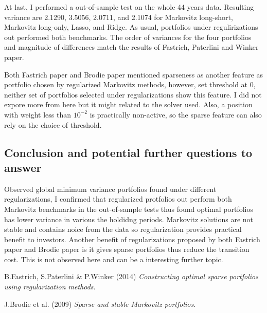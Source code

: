\documentclass{article}
\begin{document}
At last, I performed a out-of-sample test on the whole 44 years data. Resulting
variance are 2.1290, 3.5056, 2.0711, and 2.1074 for Markovitz long-short,
Markovitz long-only, Lasso, and Ridge. As usual, portfolios under regulirizations
out performed both benchmarks. The order of variances for the four portfolios
and magnitude of differences
match the results of Fastrich, Paterlini and Winker paper.

Both Fastrich paper and Brodie paper mentioned sparseness as another feature as
portfolio chosen by regularized Markovitz methods, however, set threshold at 0,
neither set of portfolios selected under regularizations show this feature. I
did not expore more from here but it might related to the solver used. Also,
a position with weight less than $10^{-2}$ is practically non-active, so the
sparse feature can also rely on the choice of threshold.

\subsection*{Conclusion and potential further questions to answer}

Observed global minimum variance portfolios found under different regularizations,
I confirmed that regularized protfolios out perform both Markovitz benchmarks
in the out-of-sample tests thus found optimal portfolios has lower variance in various
the holdidng periods. Markovitz solutions are not stable and contains noice from the
data so regularization provides practical benefit to investors. Another benefit
of regularizations proposed by both Fastrich paper and Brodie paper is it gives
sparse portfolios thus reduce the transition cost. This is not observed here
and can be a interesting further topic.

\begin{thebibliography}{9}
B.Fastrich, S.Paterlini \& P.Winker (2014)
\textit{Constructing optimal sparse portfolios using regularization methods}.

J.Brodie et al. (2009)
\textit{Sparse and stable Markovitz portfolios}.
\end{thebibliography}
\end{document}
